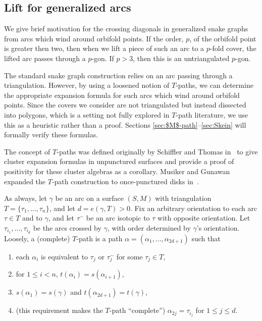 \subsection{Lift for generalized arcs}\label{subsec:LiftGenArc}

We give brief motivation for the crossing diagonals in generalized snake graphs from arcs which wind around orbifold points. If the order, $p$, of the orbifold point is greater then two, then when we lift a piece of such an arc to a $p$-fold cover, the lifted arc passes through a $p$-gon. If $p > 3$, then this is an untriangulated $p$-gon.

The standard snake graph construction relies on an arc passing through a triangulation. However, by using a loosened notion of $T$-paths, we can determine the appropriate expansion formula for such arcs which wind around orbifold points. Since the covers we consider are not triangulated but instead dissected into polygons, which is a setting not fully explored in $T$-path literature, we use this as a heuristic rather than a proof. Sections \ref{sec:$M$-path}--\ref{sec:Skein} will formally verify these formulas.

The concept of $T$-paths was defined originally by Schiffler and Thomas in~\cite{Schiffler-Thomas} to give cluster expansion formulas in unpunctured surfaces and provide a proof of positivity for these cluster algebras as a corollary. Musiker and Gunawan expanded the $T$-path construction to once-punctured disks in~\cite{Musiker-Gunawan}.

As always, let $\gamma$ be an arc on a surface $(S,M)$ with triangulation $T = \{\tau_1, \ldots, \tau_n\}$, and let $d = e(\gamma,T) > 0$. Fix an arbitrary orientation to each arc $\tau \in T$ and to $\gamma$, and let $\tau^-$ be an arc isotopic to $\tau$ with opposite orientation. Let $\tau_{i_1},\ldots, \tau_{i_d}$ be the arcs crossed by $\gamma$, with order determined by $\gamma$'s orientation. Loosely, a (complete) $T$-path is a path $\alpha = (\alpha_1,\ldots, \alpha_{2d+1})$ such that
\begin{enumerate}\itemsep=0pt
 \item[1)] each $\alpha_i$ is equivalent to $\tau_j$ or $\tau_j^-$ for some $\tau_j \in T$,
 \item[2)] for $1 \leq i < n$, $t(\alpha_i) = s(\alpha_{i+1})$,
 \item[3)] $s(\alpha_1) = s(\gamma)$ and $t(\alpha_{2d+1}) = t(\gamma)$,
 \item[4)] (this requirement makes the $T$-path ``complete'') $\alpha_{2j} = \tau_{i_j}$ for $1 \leq j \leq d$.
\end{enumerate}

